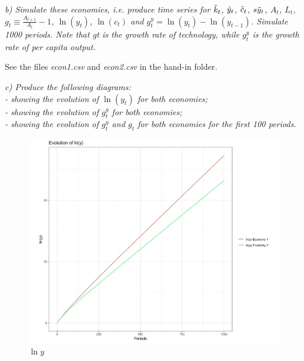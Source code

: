 \documentclass[11pt]{article} %
\begin{document}
\pagebreak
\textit{b) Simulate these economies, i.e. produce time series for $\Tilde{k}_t$, $\Tilde{y}_t$, $\Tilde{c}_t$, $s\Tilde{y}_t$, $A_t$, $L_t$, $g_t \equiv \frac{A_{t+1}}{A_t} - 1$, $\ln(y_t)$, $\ln(c_t)$ and $g_t^y = \ln(y_t) - \ln(y_{t-1})$. Simulate 1000 periods. Note that gt is the growth rate of technology, while $g_t^y$ is the growth rate of per capita output.}\par

See the files \textit{econ1.csv} and \textit{econ2.csv} in the hand-in folder.

\bigskip

\bigskip

\bigskip



\textit{c) Produce the following diagrams:\\
- showing the evolution of $\ln(y_t)$ for both economies;\\
- showing the evolution of $g_t^y$ for both economies;\\
- showing the evolution of $g_t^y$ and $g_t$ for both economies for the first 100 periods.}

 \begin{figure}[h!]
\caption{$\ln{y}$}
\centering
\label{figure1}
\includegraphics[width=11.5cm]{plots/lny.jpeg}
\end{figure}
\end{document}
